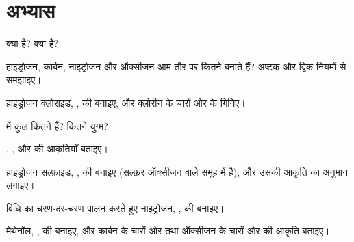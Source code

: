 \section{अभ्यास}

\begin{exercise}[$\star$]\label{exo:g10:lewis-and-shape:1}
 क्या है?  क्या है?
\end{exercise}

\begin{exercise}[$\star$]\label{exo:g10:lewis-and-shape:2}
हाइड्रोजन, कार्बन, नाइट्रोजन और ऑक्सीजन आम तौर पर कितने 
बनाते हैं? अष्टक और द्विक नियमों से समझाइए।
\end{exercise}

\begin{exercise}[$\star$]\label{exo:g10:lewis-and-shape:3}
हाइड्रोजन क्लोराइड, , की  बनाइए, और क्लोरीन के चारों ओर
के  गिनिए।
\end{exercise}

\begin{exercise}[$\star$]\label{exo:g10:lewis-and-shape:4}
  में कुल कितने  हैं? कितने
युग्म?
\end{exercise}

\begin{exercise}[$\star$]\label{exo:g10:lewis-and-shape:5}
, ,  और  की आकृतियाँ बताइए।
\end{exercise}

\begin{exercise}[$\star\star$]\label{exo:g10:lewis-and-shape:6}
हाइड्रोजन सल्फ़ाइड, , की  बनाइए (सल्फ़र ऑक्सीजन वाले
समूह में है), और उसकी आकृति का अनुमान लगाइए।
\end{exercise}

\begin{exercise}[$\star\star$]\label{exo:g10:lewis-and-shape:7}
विधि का चरण-दर-चरण पालन करते हुए नाइट्रोजन, , की 
बनाइए।
\end{exercise}

\begin{exercise}[$\star\star$]\label{exo:g10:lewis-and-shape:8}
मेथेनॉल, , की  बनाइए, और कार्बन के चारों ओर तथा
ऑक्सीजन के चारों ओर की आकृति बताइए।
\end{exercise}

